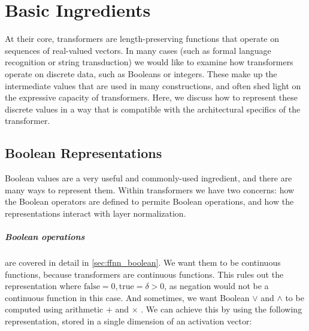 %
\chapter{Basic Ingredients}
%

At their core, transformers are length-preserving functions that operate on sequences of real-valued vectors.
In many cases (such as formal language recognition or string transduction) we would like to examine how transformers operate on discrete data, such as Booleans or integers.
These make up the intermediate values that are used in many constructions, and often shed light on the expressive capacity of transformers.
Here, we discuss how to represent these discrete values in a way that is compatible with the architectural specifics of the transformer.




\section{Boolean Representations}
\label{sec:booleans}

Boolean values are a very useful and commonly-used ingredient, and there are many ways to represent them.
Within transformers we have two concerns: how the Boolean operators are defined to permite Boolean operations, and how the representations interact with layer normalization.

\paragraph{Boolean operations} are covered in detail in \cref{sec:ffnn_boolean}. We want them to be continuous functions, because transformers are continuous functions.
This rules out the representation where $\text{false}=0, \text{true}=\delta>0$, as negation would not be a continuous function in this case.
And sometimes, we want Boolean $\lor$ and $\land$ to be computed using arithmetic $+$ and $\times$
.
We can achieve this by using the following representation, stored in a single dimension of an activation vector:

